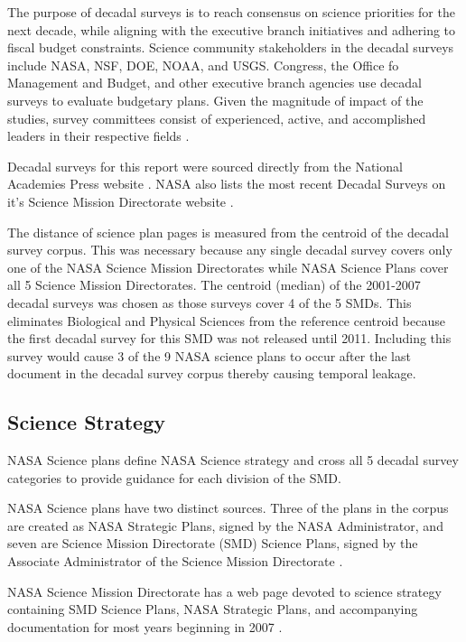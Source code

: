 \documentclass[preprint,12pt]{elsarticle}
\begin{document}
The purpose of decadal surveys is to reach consensus on science priorities for the next decade, while aligning with the executive branch initiatives and adhering to fiscal budget constraints. Science community stakeholders in the decadal surveys include NASA, NSF, DOE, NOAA, and USGS. Congress, the Office fo Management and Budget, and other executive branch agencies use decadal surveys to evaluate budgetary plans. Given the magnitude of impact of the studies, survey committees consist of experienced, active, and accomplished leaders in their respective fields \cite{Academies2015_lessons}.

Decadal surveys for this report were sourced directly from the National Academies Press website \cite{Academies_decadal}. NASA also lists the most recent Decadal Surveys on it's Science Mission Directorate website \cite{NASA_decadal}.

The distance of science plan pages is measured from the centroid of the decadal survey corpus. This was necessary because any single decadal survey covers only one of the NASA Science Mission Directorates while NASA Science Plans cover all 5 Science Mission Directorates. The centroid (median) of the 2001-2007 decadal surveys was chosen as those surveys cover 4 of the 5 SMDs. This eliminates Biological and Physical Sciences from the reference centroid because the first decadal survey for this SMD was not released until 2011. Including this survey would cause 3 of the 9 NASA science plans to occur after the last document in the decadal survey corpus thereby causing temporal leakage. 

\subsection{Science Strategy}
NASA Science plans define NASA Science strategy and cross all 5 decadal survey categories to provide guidance for each division of the SMD. 

NASA Science plans have two distinct sources. Three of the plans in the corpus are created as NASA Strategic Plans, signed by the NASA Administrator, and seven are Science Mission Directorate (SMD) Science Plans, signed by the Associate Administrator of the Science Mission Directorate\cite{SMD_2007} \cite{SMD_2010} \cite{NSP_2011} \cite{SMD_2014} \cite{NSP_2018} \cite{SMD_2020} \cite{NSP_2022} \cite{SMD_2022} \cite{SMD_2023} \cite{SMD_2025}.

 NASA Science Mission Directorate has a web page devoted to science strategy containing SMD Science Plans, NASA Strategic Plans, and accompanying documentation for most years beginning in 2007 \cite{NASA_sci_strat}. 
\end{document}
